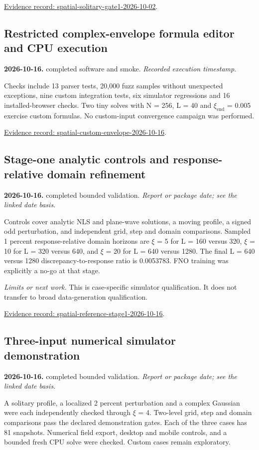 \documentclass[11pt]{article}
\begin{document}
\noindent\href{https://github.com/matasvai/dysthe-paper/blob/codex/research-record-2026-11-05/research-record/2026-11-05/README.md#spatial-solitary-gate1-2026-10-02}{Evidence record: spatial-solitary-gate1-2026-10-02}.
\subsection*{Restricted complex-envelope formula editor and CPU execution}
\noindent\textbf{2026-10-16.} completed software and smoke. \emph{Recorded execution timestamp}.\par
Checks include 13 parser tests, 20,000 fuzz samples without unexpected exceptions, nine custom integration tests, six simulator regressions and 16 installed-browser checks. Two tiny solves with N = 256, L = 40 and $\xi_{\mathrm{end}}$ = 0.005 exercise custom formulas. No custom-input convergence campaign was performed.

\noindent\href{https://github.com/matasvai/dysthe-paper/blob/codex/research-record-2026-11-05/research-record/2026-11-05/README.md#spatial-custom-envelope-2026-10-16}{Evidence record: spatial-custom-envelope-2026-10-16}.
\subsection*{Stage-one analytic controls and response-relative domain refinement}
\noindent\textbf{2026-10-16.} completed bounded validation. \emph{Report or package date; see the linked date basis}.\par
Controls cover analytic NLS and plane-wave solutions, a moving profile, a signed odd perturbation, and independent grid, step and domain comparisons. Sampled 1 percent response-relative domain horizons are $\xi$ = 5 for L = 160 versus 320, $\xi$ = 10 for L = 320 versus 640, and $\xi$ = 20 for L = 640 versus 1280. The final L = 640 versus 1280 discrepancy-to-response ratio is 0.0053783. FNO training was explicitly a no-go at that stage.

\noindent\textit{Limits or next work.} This is case-specific simulator qualification. It does not transfer to broad data-generation qualification.

\noindent\href{https://github.com/matasvai/dysthe-paper/blob/codex/research-record-2026-11-05/research-record/2026-11-05/README.md#spatial-reference-stage1-2026-10-16}{Evidence record: spatial-reference-stage1-2026-10-16}.
\subsection*{Three-input numerical simulator demonstration}
\noindent\textbf{2026-10-16.} completed bounded validation. \emph{Report or package date; see the linked date basis}.\par
A solitary profile, a localized 2 percent perturbation and a complex Gaussian were each independently checked through $\xi$ = 4. Two-level grid, step and domain comparisons pass the declared demonstration gates. Each of the three cases has 81 snapshots. Numerical field export, desktop and mobile controls, and a bounded fresh CPU solve were checked. Custom cases remain exploratory.
\end{document}
